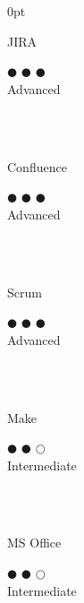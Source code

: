 \documentclass[a4paper]{article}
\begin{document}
\begin{adjustwidth}{\parindent}{0pt}
\begin{minipage}[t]{0.25\textwidth}
\begin{minipage}{0.65\textwidth}
  \small{JIRA}
\end{minipage}
\begin{minipage}{0.3\textwidth}
  \centering $\mdlgblkcircle$ $\mdlgblkcircle$ $\mdlgblkcircle$ \\  \footnotesize{Advanced}
\end{minipage} \\ \hspace{0pt} \\

\begin{minipage}{0.65\textwidth}
  \small{Confluence}
\end{minipage}
\begin{minipage}{0.3\textwidth}
  \centering $\mdlgblkcircle$ $\mdlgblkcircle$ $\mdlgblkcircle$ \\  \footnotesize{Advanced}
\end{minipage} \\ \hspace{0pt} \\

\begin{minipage}{0.65\textwidth}
  \small{Scrum}
\end{minipage}
\begin{minipage}{0.3\textwidth}
  \centering $\mdlgblkcircle$ $\mdlgblkcircle$ $\mdlgblkcircle$ \\  \footnotesize{Advanced}
\end{minipage} \\ \hspace{0pt} \\

\begin{minipage}{0.65\textwidth}
  \small{Make}
\end{minipage}
\begin{minipage}{0.3\textwidth}
  \centering $\mdlgblkcircle$ $\mdlgblkcircle$ $\mdlgwhtcircle$ \\  \footnotesize{Intermediate}
\end{minipage} \\ \hspace{0pt} \\

 \begin{minipage}{0.65\textwidth}
  \small{MS Office}
\end{minipage}
\begin{minipage}{0.3\textwidth}
  \centering $\mdlgblkcircle$ $\mdlgblkcircle$ $\mdlgwhtcircle$ \\  \footnotesize{\mbox{Intermediate}}
\end{minipage} \\ \hspace{0pt} \\


\end{minipage}
\end{adjustwidth}
\end{document}
